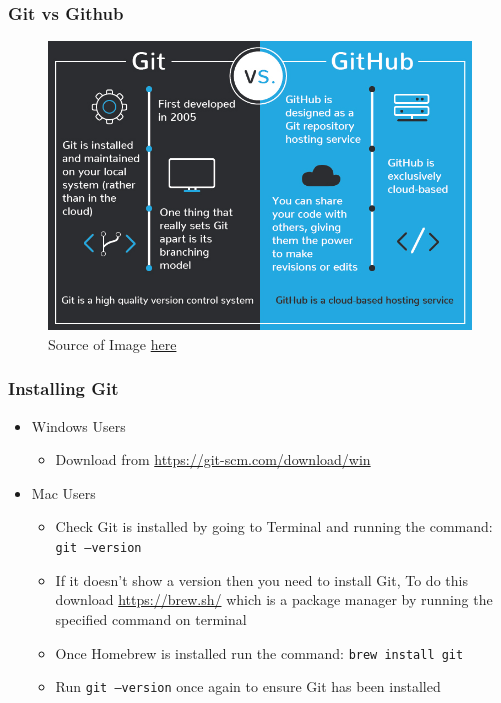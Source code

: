\documentclass{beamer}
\begin{document}
\begin{frame}
  \frametitle{Git vs Github}
  	\begin{figure}
		\includegraphics[scale=0.3]{./git-vs-github}
		\caption{Source of Image \href{https://blog.devmountain.com/git-vs-github-whats-the-difference/}{here}}
	\end{figure}
\end{frame}


\begin{frame}
  \frametitle{Installing Git}
  \begin{itemize}
    	\item Windows Users	
    	\begin{itemize}
  			\item Download from \href{https://git-scm.com/download/win}{https://git-scm.com/download/win}
  		\end{itemize}
  		\item Mac Users	
    	\begin{itemize}
  			\item Check Git is installed by going to Terminal and running the command: \texttt{git --version}
  			\item If it doesn't show a version then you need to install Git, To do this download \href{Homebrew}{https://brew.sh/} which is a package manager by running the specified command on terminal
  			\item Once Homebrew is installed run the command: \texttt{brew install git}
  			\item Run \texttt{git --version} once again to ensure Git has been installed
  		\end{itemize}
  \end{itemize}
\end{frame}
\end{document}
